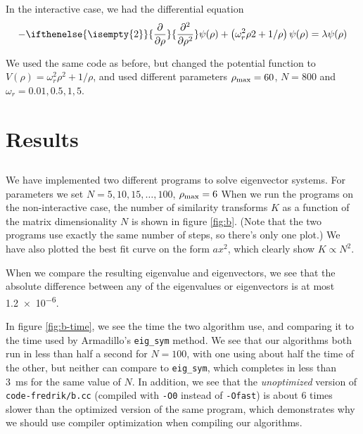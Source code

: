 \documentclass[11pt,a4paper]{article}
\newcommand\pdf[3][]{{%
  \ifthenelse{\isempty{#1}}%
    {\frac{\partial{#2}}{\partial{#3}}}%
    {\frac{\partial^{#1}{#2}}{{\partial{#3}^{#1}}}}%
}}
\begin{document}

\subsection{}

In the interactive case, we had the differential equation
\begin{equation}
  \label{eq:diff-interact}
  - \pdf[2]{}{\rho} \psi(\rho) + \left( \omega_r^2 \rho 2 + 1 / \rho \right) \psi(\rho) = \lambda \psi(\rho)
\end{equation}

We used the same code as before, but changed the potential function to $V(\rho) = \omega_r^2 \rho^2 + 1/\rho$, and used different parameters $\rho_{\rm max} = 60$, $N = 800$ and $\omega_r = 0.01, 0.5, 1, 5$.

\section{Results}

\subsection{}

We have implemented two different programs to solve eigenvector systems. For parameters we set $N = 5,10,15,\ldots,100$, $\rho_{\rm max} = 6$ When we run the programs on the non-interactive case, the number of similarity transforms $K$ as a function of the matrix dimensionality $N$ is shown in figure \ref{fig:b}. (Note that the two programs use exactly the same number of steps, so there's only one plot.) We have also plotted the best fit curve on the form $a x^2$, which clearly show $K \propto N^2$.

When we compare the resulting eigenvalue and eigenvectors, we see that the absolute difference between any of the eigenvalues or eigenvectors is at most \num{1.2e-6}.

In figure \ref{fig:b-time}, we see the time the two algorithm use, and comparing it to the time used by Armadillo's \texttt{eig\_sym} method. We see that our algorithms both run in less than half a second for $N = 100$, with one using about half the time of the other, but neither can compare to \texttt{eig\_sym}, which completes in less than \SI{3}{\milli\second} for the same value of $N$. In addition, we see that the \emph{unoptimized} version of \texttt{code-fredrik/b.cc} (compiled with \texttt{-O0} instead of \texttt{-Ofast}) is about 6 times slower than the optimized version of the same program, which demonstrates why we should use compiler optimization when compiling our algorithms.
\end{document}
